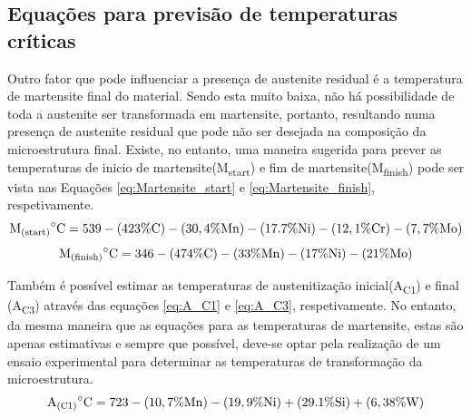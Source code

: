 \subsection{Equações para previsão de temperaturas críticas}\label{ssec:previsao_martensite}
Outro fator que pode influenciar a presença de austenite residual é a temperatura de martensite final do material. Sendo esta muito baixa, não há possibilidade de toda a austenite ser transformada em martensite, portanto, resultando numa presença de austenite residual que pode não ser desejada na composição da microestrutura final. Existe, no entanto, uma maneira sugerida para prever as temperaturas de inicio de martensite(M\textsubscript{start}) e fim de martensite(M\textsubscript{finish}) pode ser vista nas Equações \ref{eq:Martensite_start} e \ref{eq:Martensite_finish}, respetivamente\cite{Honeycombe1995}.
\begin{equation}
    \label{eq:Martensite_start}
    \mathrm{M\textsubscript{(start)}}^{\circ}\mathrm{C} = 539-(423\%\mathrm{C})-(30,4\%\mathrm{Mn})-(17.7\%\mathrm{Ni})-(12,1\%\mathrm{Cr})-(7,7\%\mathrm{Mo})
\end{equation}
\begin{equation}
    \label{eq:Martensite_finish}
    \mathrm{M\textsubscript{(finish)}}^{\circ}\mathrm{C} = 346 - (474\%\mathrm{C}) - (33\%\mathrm{Mn}) - (17\%\mathrm{Ni}) - (21\%\mathrm{Mo})
\end{equation}
\par
Também é possível estimar as temperaturas de austenitização inicial(A\textsubscript{C1}) e final (A\textsubscript{C3}) através das equações \ref{eq:A_C1} e \ref{eq:A_C3}, respetivamente\cite{Platl2020}. No entanto, da mesma maneira que as equações para as temperaturas de martensite, estas são apenas estimativas e sempre que possível, deve-se optar pela realização de um ensaio experimental para determinar as temperaturas de transformação da microestrutura.
\begin{equation}
    \label{eq:A_C1}
    \mathrm{A\textsubscript{(C1)}}^{\circ}\mathrm{C} = 723 - (10,7\%\mathrm{Mn}) - (19,9\%\mathrm{Ni}) + (29.1\%\mathrm{Si}) + (6,38\%\mathrm{W})
\end{equation}
